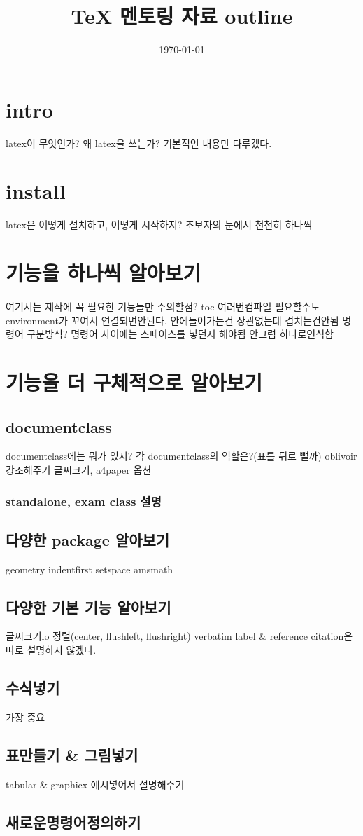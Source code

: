 \documentclass[11pt]{article}
\date{\today}
\title{\TeX{} 멘토링 자료 outline}
\begin{document}
\maketitle
\tableofcontents

\section{intro}
\label{sec:orga2e16a8}
latex이 무엇인가?
왜 latex을 쓰는가?
기본적인 내용만 다루겠다.
\section{install}
\label{sec:org09aecb9}
latex은 어떻게 설치하고, 어떻게 시작하지?
초보자의 눈에서 천천히 하나씩
\section{기능을 하나씩 알아보기}
\label{sec:org55d6494}
여기서는 제작에 꼭 필요한 기능들만
주의할점? toc 여러번컴파일 필요할수도
environment가 꼬여서 연결되면안된다. 안에들어가는건 상관없는데 겹치는건안됨
명령어 구분방식?
명령어 사이에는 스페이스를 넣던지 해야됨 안그럼 하나로인식함

\section{기능을 더 구체적으로 알아보기}
\label{sec:orgf5059d7}
\subsection{documentclass}
\label{sec:orgd41a5a0}
documentclass에는 뭐가 있지? 각 documentclass의 역할은?(표를 뒤로 뺄까)
oblivoir 강조해주기
글씨크기, a4paper 옵션
\subsubsection{standalone, exam class 설명}
\label{sec:orgeb27062}
\subsection{다양한 package 알아보기}
\label{sec:org45318ab}
geometry
indentfirst
setspace
amsmath
\subsection{다양한 기본 기능 알아보기}
\label{sec:org0aac5e1}
글씨크기lo
정렬(center, flushleft, flushright)
verbatim
label \& reference
citation은 따로 설명하지 않겠다.
\subsection{수식넣기}
\label{sec:orgdd36863}
가장 중요
\subsection{표만들기 \& 그림넣기}
\label{sec:orgf71d8dd}
tabular \& graphicx
예시넣어서 설명해주기
\subsection{새로운명령어정의하기}
\label{sec:org6aa38c6}
\end{document}
